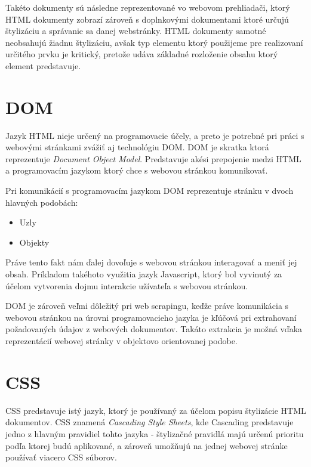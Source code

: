 Takéto dokumenty sú následne reprezentované vo webovom prehliadači, ktorý HTML dokumenty zobrazí zároveň s doplnkovými dokumentami ktoré určujú štylizáciu a správanie sa danej webstránky. HTML dokumenty samotné neobsahujú žiadnu štylizáciu, avšak typ elementu ktorý použijeme pre realizovaní určitého prvku je kritický, pretože udáva základné rozloženie obsahu ktorý element predstavuje.\cite{WhatisHTML}

\section{DOM}

Jazyk HTML nieje určený na programovacie účely, a preto je potrebné pri práci s webovými stránkami zvážiť aj technológiu DOM. DOM je skratka ktorá reprezentuje \textit{Document Object Model}. Predstavuje akési prepojenie medzi HTML a programovacím jazykom ktorý chce s webovou stránkou komunikovať. \cite{DOM}

Pri komunikácií s programovacím jazykom DOM reprezentuje stránku v dvoch hlavných podobách:

\begin{itemize}
    \item {Uzly}
    \item {Objekty}
\end{itemize}

Práve tento fakt nám ďalej dovoľuje s webovou stránkou interagovať a meniť jej obsah. Príkladom takéhoto využitia jazyk Javascript, ktorý bol vyvinutý za účelom vytvorenia dojmu interakcie užívateľa s webovou stránkou. 

DOM je zároveň veľmi dôležitý pri web scrapingu, keďže práve komunikácia s webovou stránkou na úrovni programovacieho jazyka je kľúčová pri extrahovaní požadovaných údajov z webových dokumentov. Takáto extrakcia je možná vďaka reprezentácií webovej stránky v objektovo orientovanej podobe.

\section{CSS}

CSS predstavuje istý jazyk, ktorý je používaný za účelom popisu štylizácie HTML dokumentov. CSS znamená \textit{Cascading Style Sheets}, kde Cascading predstavuje jedno z hlavným pravidiel tohto jazyka - štylizačné pravidlá majú určenú prioritu podľa ktorej budú aplikované, a zároveň umožňujú na jednej webovej stránke používať viacero CSS súborov. 

